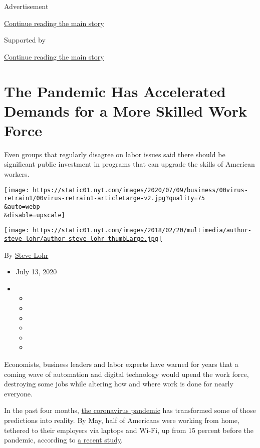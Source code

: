 Advertisement

\protect\hyperlink{after-top}{Continue reading the main story}

Supported by

\protect\hyperlink{after-sponsor}{Continue reading the main story}

\hypertarget{the-pandemic-has-accelerated-demands-for-a-more-skilled-work-force}{%
\section{The Pandemic Has Accelerated Demands for a More Skilled Work
Force}\label{the-pandemic-has-accelerated-demands-for-a-more-skilled-work-force}}

Even groups that regularly disagree on labor issues said there should be
significant public investment in programs that can upgrade the skills of
American workers.

\texttt{[image: https://static01.nyt.com/images/2020/07/09/business/00virus-retrain1/00virus-retrain1-articleLarge-v2.jpg?quality=75\\\&auto=webp\\\&disable=upscale]}

\href{https://www.nytimes.com/by/steve-lohr}{\texttt{[image: https://static01.nyt.com/images/2018/02/20/multimedia/author-steve-lohr/author-steve-lohr-thumbLarge.jpg]}}

By \href{https://www.nytimes.com/by/steve-lohr}{Steve Lohr}

\begin{itemize}
\item
  July 13, 2020
\item
  \begin{itemize}
  \item
  \item
  \item
  \item
  \item
  \item
  \end{itemize}
\end{itemize}

Economists, business leaders and labor experts have warned for years
that a coming wave of automation and digital technology would upend the
work force, destroying some jobs while altering how and where work is
done for nearly everyone.

In the past four months,
\href{https://www.nytimes.com/news-event/coronavirus}{the coronavirus
pandemic} has transformed some of those predictions into reality. By
May, half of Americans were working from home, tethered to their
employers via laptops and Wi-Fi, up from 15 percent before the pandemic,
according to \href{https://www.brynjolfsson.com/remotework/}{a recent
study}.

